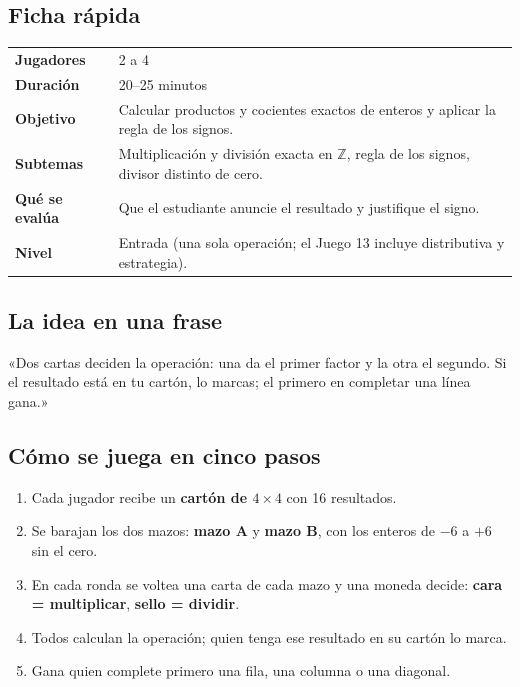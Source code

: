 \documentclass[12pt, letterpaper]{article}
\newcommand{\Z}{\mathbb{Z}}
\begin{document}
\subsection{Ficha rápida}

\begin{center}
\small
\begin{tabular}{@{}p{3cm} p{12.2cm}@{}}
\toprule
\textbf{Jugadores} & 2 a 4\\
\textbf{Duración} & 20--25 minutos\\
\textbf{Objetivo} & Calcular productos y cocientes exactos de enteros y aplicar la regla de los signos.\\
\textbf{Subtemas} & Multiplicación y división exacta en $\Z$, regla de los signos, divisor distinto de cero.\\
\textbf{Qué se evalúa} & Que el estudiante anuncie el resultado y justifique el signo.\\
\textbf{Nivel} & Entrada (una sola operación; el Juego 13 incluye distributiva y estrategia).\\
\bottomrule
\end{tabular}
\end{center}

\subsection{La idea en una frase}

\begin{cuadroextra}
  «Dos cartas deciden la operación: una da el primer factor y la otra el segundo. Si el resultado está en tu cartón, lo marcas; el primero en completar una línea gana.»
\end{cuadroextra}

\subsection{Cómo se juega en cinco pasos}

\begin{enumerate}[leftmargin=*]
  \item Cada jugador recibe un \textbf{cartón de $4\times 4$} con 16 resultados.
  \item Se barajan los dos mazos: \textbf{mazo A} y \textbf{mazo B}, con los enteros de $-6$ a $+6$ sin el cero.
  \item En cada ronda se voltea una carta de cada mazo y una moneda decide: \textbf{cara = multiplicar}, \textbf{sello = dividir}.
  \item Todos calculan la operación; quien tenga ese resultado en su cartón lo marca.
  \item Gana quien complete primero una fila, una columna o una diagonal.
\end{enumerate}
\end{document}
